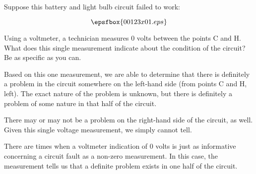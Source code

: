 

Suppose this battery and light bulb circuit failed to work:

$$\epsfbox{00123x01.eps}$$

Using a voltmeter, a technician measures 0 volts between the points C and H.  What does this single measurement indicate about the condition of the circuit?  Be as specific as you can.







Based on this one measurement, we are able to determine that there is definitely a problem in the circuit somewhere on the left-hand side (from points C and H, left).  The exact nature of the problem is unknown, but there is definitely a problem of some nature in that half of the circuit.

There may or may not be a problem on the right-hand side of the circuit, as well.  Given this single voltage measurement, we simply cannot tell.







There are times when a voltmeter indication of 0 volts is just as informative concerning a circuit fault as a non-zero measurement.  In this case, the measurement tells us that a definite problem exists in one half of the circuit.




